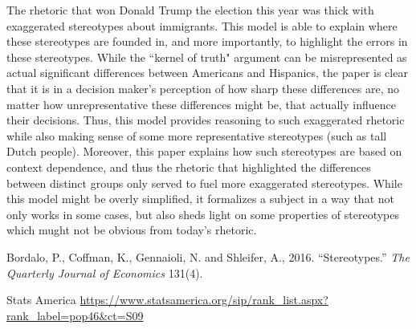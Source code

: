 \documentclass[12pt]{article}
\theoremstyle{definition}
\numberwithin{equation}{section}
\begin{document}
\begin{flushleft}
The rhetoric that won Donald Trump the election this year was thick with exaggerated stereotypes about immigrants. This model is able to explain where these stereotypes are founded in, and more importantly, to highlight the errors in these stereotypes. While the ``kernel of truth" argument can be misrepresented as actual significant differences between Americans and Hispanics, the paper is clear that it is in a decision maker's perception of how sharp these differences are, no matter how unrepresentative these differences might be, that actually influence their decisions. Thus, this model provides reasoning to such exaggerated rhetoric while also making sense of some more representative stereotypes (such as tall Dutch people). Moreover, this paper explains how such stereotypes are based on context dependence, and thus the rhetoric that highlighted the differences between distinct groups only served to fuel more exaggerated stereotypes. While this model might be overly simplified, it formalizes a subject in a way that not only works in some cases, but also sheds light on some properties of stereotypes which mught not be obvious from today's rhetoric.\\
\end{flushleft}

\begin{thebibliography}{9}
Bordalo, P., Coffman, K., Gennaioli, N. and Shleifer, A., 2016. “Stereotypes.” \textit{The
Quarterly Journal of Economics} 131(4).

Stats America
\url{https://www.statsamerica.org/sip/rank_list.aspx?rank_label=pop46&ct=S09}
\end{thebibliography}
\end{document}

